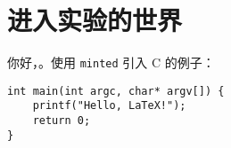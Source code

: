 \section{进入实验的世界}

\par 你好，\LaTeXe。使用 \verb|minted| 引入 C 的例子：

\begin{verbatim}
int main(int argc, char* argv[]) {
    printf("Hello, LaTeX!");
    return 0;
}
\end{verbatim}